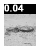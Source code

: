 \begin{figure}[H]
\begin{subfigure}[t]{0.15\textwidth}
    \includegraphics[width=\linewidth]{img/one-trial/loss_eval/L1/stimulus_0_image_shift_x_9_L1.png}
  \end{subfigure}
  \\
    \vspace{0.1cm}
    

\end{figure}
